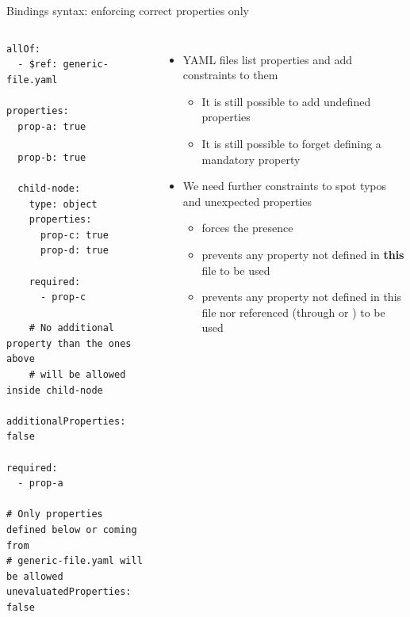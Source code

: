 \begin{frame}[fragile]{Bindings syntax: enforcing correct properties only}
  \begin{columns}
    \begin{block}{}
      {\fontsize{5}{6}\selectfont
\begin{verbatim}
allOf:
  - $ref: generic-file.yaml

properties:
  prop-a: true

  prop-b: true

  child-node:
    type: object
    properties:
      prop-c: true
      prop-d: true

    required:
      - prop-c

    # No additional property than the ones above
    # will be allowed inside child-node
    additionalProperties: false

required:
  - prop-a

# Only properties defined below or coming from
# generic-file.yaml will be allowed
unevaluatedProperties: false
\end{verbatim}
      }
    \end{block}
    \begin{itemize}
    \item YAML files list properties and add constraints to them
      \begin{itemize}
      \item It is still possible to add undefined properties
      \item It is still possible to forget defining a mandatory
        property
      \end{itemize}
    \item We need further constraints to spot typos and unexpected
      properties
      \begin{itemize}
      \item {} forces the presence
      \item {} prevents any property not
        defined in {\bf this} file to be used
      \item {} prevents any property not
        defined in this file nor referenced (through
         or {}) to be
        used
      \end{itemize}
    \end{itemize}
  \end{columns}
\end{frame}

